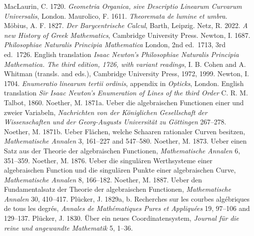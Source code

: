 \newline\indent  MacLaurin, C. 1720.  \emph{Geometria Organica, sive Descriptio Linearum Curvarum Universalis}, London.
 \newline\indent Maurolico, F. 1611. \emph{Theoremata de lumine et umbra}. 
 \newline\indent M\"obius, A. F. 1827. \emph{Der Barycentrische Calcul}, Barth, Leipzig.
 \newline\indent  Netz, R. 2022. \emph{A new History of Greek Mathematics}, Cambridge University Press.
\newline\indent Newton, I. 1687. \emph{Philosophiae  Naturalis Principia Mathematica} London, 2nd ed.\ 1713, 3rd ed.\ 1726. English translation \emph{Isaac Newton's Philosophiae Naturalis Principia Mathematica. The third edition, 1726, with variant readings}, I. B. Cohen and A. Whitman (transls. and eds.), Cambridge University Press, 1972, 1999.
\newline\indent Newton, I. 1704. \emph{Enumeratio linearum tertii ordinis}, appendix in \emph{Opticks}, London. English translation \emph{Sir Isaac Newton's Enumeration of Lines of the third Order} C. R. M. Talbot, 1860.
\newline\indent Noether, M. 1871a. Ueber die algebraischen Functionen einer und zweier Variabeln, \emph{Nachrichten von der K\"oniglichen Gesellschaft der Wissenschaften und der Georg-Au\-gusts Universit\"at zu G\"ottingen} 267--278.
\newline\indent Noether, M. 1871b. Ueber Fl\"achen, welche Schaaren rationaler Curven besitzen, \emph{Mathematische  Annalen} 3,   161--227 and 547--580.
\newline\indent Noether, M. 1873. Ueber einen Satz aus der Theorie der algebraischen Functionen, \emph{Mathematische Annalen} 6, 351--359.
\newline\indent Noether, M. 1876.  Ueber die singul\"aren Werthsysteme einer algebraischen Function und die singul\"aren Punkte einer algebraischen Curve, \emph{Mathematische  Annalen} 8, 166--182.
\newline\indent Noether, M. 1887. Ueber den Fundamentalsatz der Theorie der
algebraischen Functionen,  \emph{Mathematische Annalen} 30, 410--417. 
\newline\indent Pl\"ucker, J. 1829a, b. Recherches sur les courbes alg\'ebriques de tous les degr\'es, \emph{Annales de Math\'e\-matiques Pures et Appliqu\'ees} 19, 97--106 and 129--137.
\newline\indent Pl\"ucker, J. 1830. \"Uber ein neues Coordinatensystem, \emph{Journal f\"ur die reine und angewandte Mathematik} 5, 1--36.
